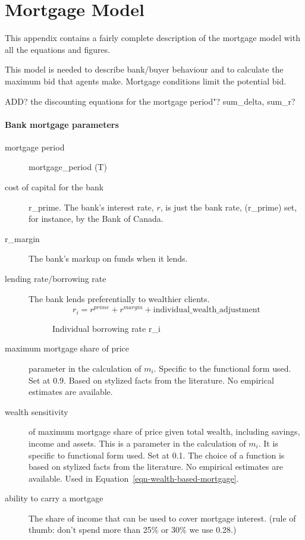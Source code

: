 
\chapter[Mortgage Model]{Mortgage Model}

This appendix contains a fairly complete description of the mortgage model with all the equations and figures.

This model is needed to describe bank/buyer behaviour and to calculate the maximum bid that agents make. Mortgage conditions limit the potential bid.

ADD? the discounting equations for the mortgage period"?
sum\_delta, sum\_r?


\subsubsection{Bank mortgage parameters}

\begin{description}
\item [mortgage period]  mortgage\_period (T)
\item [cost of capital for the bank] r\_prime. The bank's interest rate, $r$, is just the bank rate, (r\_prime) set, for instance, by the Bank of Canada.  
\item [r\_margin] The bank's markup on funds when it lends.  
\item[lending rate/borrowing rate] The bank lends preferentially to wealthier clients.  
\[r_i=r^{prime} + r^{margin} + \mathrm{individual\_wealth\_adjustment}\] 

\begin{figure}
    \centering
 \label{fig-capital-cost}   
    \caption{Individual borrowing rate r\_i}
    \label{fig:Wealth-based}
\end{figure}

 

\item [maximum mortgage share of price] parameter in the calculation of $m_i$. Specific to the functional form used. Set at 0.9. Based on stylized facts from the literature.  No empirical estimates are available. 
\item[wealth sensitivity] of maximum mortgage share of price given total \gls{wealth}, including savings, income and assets. This is a parameter in the calculation of $m_i$. It is specific to functional form used. Set at 0.1. The choice of a function is based on stylized facts from the literature.  No empirical estimates are available.  Used in Equation~\ref{eqn-wealth-based-mortgage}. 

\item [ability to carry a mortgage] 

The share of income that can be used to cover mortgage interest. (rule of thumb: don't spend more than 25\% or 30\% we use 0.28.)
\end{description}
%

